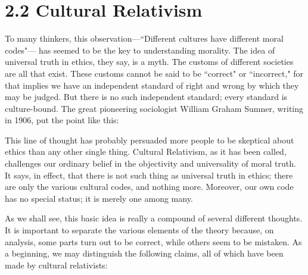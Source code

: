 \section{2.2 Cultural Relativism} 
To  many  thinkers,  this  observation—``Different  cultures  have  different 
moral  codes"— has  seemed  to  be  the  key  to  understanding  morality. 
The idea of universal truth in ethics, they say, is a myth. The customs of 
different societies are all that exist. These customs cannot be said to be 
``correct" or ``incorrect," for that implies we have an independent standard 
of  right  and  wrong  by  which  they  may  be  judged.  But  there  is  no  such 
independent standard; every standard is culture-bound. The great 
pioneering  sociologist  William  Graham  Sumner, writing in  1906,  put  the 
point like this: 

This line of thought has probably persuaded more people to be skeptical 
about  ethics  than  any  other  single  thing.  Cultural  Relativism,  as  it  has 
been called, challenges our ordinary belief in the objectivity and 
universality  of  moral  truth.  It  says,  in  effect,  that  there  is  not  such  thing 
as universal truth in ethics; there are only the various cultural codes, and 
nothing more. Moreover, our own code has no special status; it is merely 
one among many. 

As we shall see, this basic idea is really a compound of several different 
thoughts.  It  is  important  to  separate  the  various  elements  of  the  theory 
because,  on  analysis,  some  parts  turn  out  to  be  correct,  while  others 
seem  to  be mistaken.  As  a  beginning,  we may  distinguish  the  following 
claims, all of which have been made by cultural relativists: 

